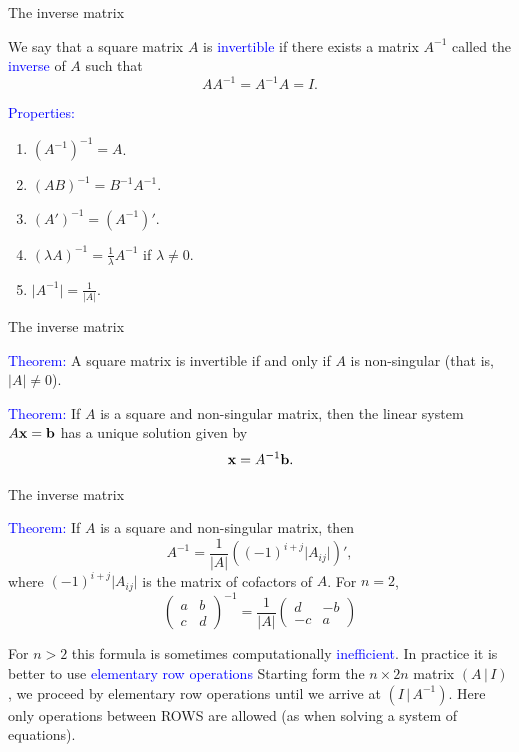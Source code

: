 \documentclass[11pt,aspectratio=169]{beamer}
\begin{document}
\begin{frame}{The inverse matrix}

We say that a square matrix $A$ is \textcolor{blue}{invertible} if there exists a matrix $A^{-1}$ called the \textcolor{blue}{inverse} of $A$ such that
$$
A A^{-1}=A^{-1}A=I.
$$



\textcolor{blue}{Properties:}
\begin{enumerate}
\item $(A^{-1})^{-1}=A$.
\item $(A B)^{-1}=B^{-1}A^{-1}.$
\item $(A')^{-1}=(A^{-1})'.$
\item $(\lambda A)^{-1}=\frac{1}{\lambda} A^{-1}$ if $\lambda \neq 0$.
\item $\vert A^{-1} \vert=\frac{1}{\vert A \vert}$.

\end{enumerate}\end{frame}

\begin{frame}{The inverse matrix}



\textcolor{blue}{Theorem:} A square matrix is invertible if and only if $A$ is non-singular (that is, $\vert A \vert \neq 0$).

\vskip 12pt

\textcolor{blue}{Theorem:} If $A$ is a square and non-singular matrix, then the linear system
$A{\bf x}={\bf b}$ has a unique solution given by $${\bf x}=A^{-1}{\bf b}.$$
 \end{frame}


\begin{frame}{The inverse matrix}

\textcolor{blue}{Theorem:} If $A$ is a square and non-singular matrix, then 
$$
A^{-1}=\frac{1}{\vert A \vert } ((-1)^{i+j} \vert A_{ij} \vert)',
$$ 
where $(-1)^{i+j} \vert A_{ij} \vert$ is the matrix of cofactors of $A$.
\vskip 10pt
For $n=2$, \begin{equation*}
 \begin{pmatrix}
a & b\\
c & d
\end{pmatrix}^{-1}=\frac{1}{\vert A \vert }\begin{pmatrix}
d & -b\\
-c & a
\end{pmatrix}
\end{equation*}

For $n>2$ this formula is sometimes computationally \textcolor{blue}{inefficient}. 
\vskip 10pt
In practice it is better to use \textcolor{blue}{elementary row operations} Starting form the $n \times 2n$ matrix $(A \, \vert\,  I)$,
we proceed by elementary row operations until we arrive at $(I \, \vert \, A^{-1})$.
Here only operations between ROWS are allowed (as when solving a system of equations).
\end{frame}
\end{document}
